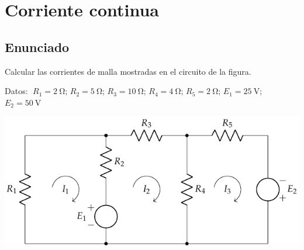 \chapter{Corriente continua}

\section{Enunciado}
Calcular las corrientes de malla mostradas en el circuito de la
figura.

\vspace{2mm}
Datos: $\; R_1 = \qty{2}{\ohm}$;\; $R_2 = \qty{5}{\ohm}$;\; $R_3 = \qty{10}{\ohm}$;\; $R_4 = \qty{4}{\ohm}$;\; $R_5 = \qty{2}{\ohm}$;\; $E_1 = \qty{25}{\volt}$;\; $E_2 = \qty{50}{\volt}$

\begin{center}
  \includegraphics{figuras/BT1_02.pdf}
\end{center}

  

